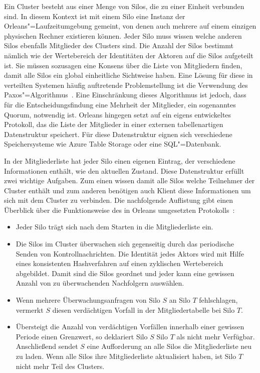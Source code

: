 Ein Cluster besteht aus einer Menge von Silos, die zu einer Einheit verbunden sind. In diesem Kontext ist mit einem Silo eine Instanz der Orleans"=Laufzeitumgebung gemeint, von denen auch mehrere auf einem einzigen physischen Rechner existieren können. Jeder Silo muss wissen welche anderen Silos ebenfalls Mitglieder des Clusters sind. Die Anzahl der Silos bestimmt nämlich wie der  Wertebereich der Identitäten der Aktoren auf die Silos aufgeteilt ist. Sie müssen sozusagen eine Konsens über die Liste von Mitgliedern finden, damit alle Silos ein global einheitliche Sichtweise haben. Eine Lösung für diese in verteilten Systemen häufig auftretende Problemstellung ist die Verwendung des Paxos"=Algorithmus~\cite{Lamport:1998:PP:279227.279229}. Eine Einschränkung dieses Algorithmus ist jedoch, dass für die Entscheidungsfindung eine Mehrheit der Mitglieder, ein sogenanntes Quorum, notwendig ist. Orleans hingegen setzt auf ein eigens entwickeltes Protokoll, das die Liste der Mitglieder in einer externen tabellenartigen Datenstruktur speichert. Für diese Datenstruktur eignen sich verschiedene Speichersysteme wie \zB  Azure Table Storage oder eine SQL"=Datenbank.

In der Mitgliederliste hat jeder Silo einen eigenen Eintrag, der verschiedene Informationen enthält, wie \zB den aktuellen Zustand. Diese Datenstruktur erfüllt zwei wichtige Aufgaben. Zum einen wissen damit alle Silos welche Teilnehmer der Cluster enthält und zum anderen benötigen auch Klient diese Informationen um sich mit dem Cluster zu verbinden. Die nachfolgende Auflistung gibt einen Überblick über die Funktionsweise des in Orleans umgesetzten Protokolls~\cite{Bernstein2014}:

\begin{itemize}
	\item Jeder Silo trägt sich nach dem Starten in die Mitgliederliste ein.
	\item Die Silos im Cluster überwachen sich gegenseitig durch das periodische Senden von Kontrollnachrichten. Die Identität jedes Aktors wird mit Hilfe eines konsistenten Hashverfahren auf einen zyklischen Wertebereich abgebildet. Damit sind die Silos geordnet und jeder kann eine gewissen Anzahl von zu überwachenden Nachfolgern auswählen.
	\item Wenn mehrere Überwachungsanfragen von Silo $S$ an Silo $T$ fehlschlagen, vermerkt $S$ diesen verdächtigen Vorfall in der Mitgliedertabelle bei Silo $T$.
	\item Übersteigt die Anzahl von verdächtigen Vorfällen innerhalb einer gewissen Periode einen Grenzwert, so deklariert Silo $S$ Silo $T$ als nicht mehr Verfügbar. Anschließend sendet $S$ eine Aufforderung an alle Silos die Mitgliederliste neu zu laden. Wenn alle Silos ihre Mitgliederliste aktualisiert haben, ist Silo $T$ nicht mehr Teil des Clusters.
\end{itemize}

